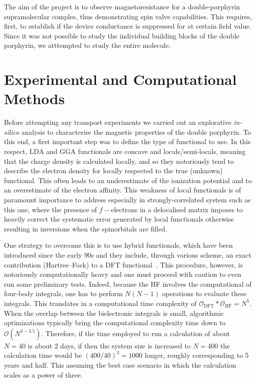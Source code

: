 The aim of the project is to observe magnetoresistance for a double-porphyrin supramolecular comples, thus demonstrating spin valve capabilities. This requires, first, to establish if the device conductance is suppressed for at certain field value. Since it was not possible to study the individual building blocks of the double porphyrin,  we atttempted to study the entire molecule.

\section{Experimental and Computational Methods}\label{sec:spinvalve:methods}

Before attempting any transport experiments we carried out an explorative \textit{in-silico} analysis to characterise the magnetic properties of the double porphyrin. To this end, a first important step was to define the type of functional to use. In this respect, \gls{LDA} and \gls{GGA} functionals are concave and locals/semi-locals, meaning that the charge density is calculated locally, and so they notoriously tend to describe the electron density for locally respected to the true (unknown) functional. This often leads to an underestimate of the ionization potential and to an overestimate of the electron affinity. This weakness of local functionals is of paramount importance to address especially in strongly-correlated system such as this one, where the presence of $f-$electrons in a delocalised matrix imposes to heavily correct the systematic error generated by local functionals otherwise resulting in inversions when the spinorbitals are filled.

One strategy to overcome this is to use hybrid functionals, which have been introduced since the early 90s and they include, through various scheme, an exact contribution (Hartree--Fock) to a DFT functional~\cite{stephens1994ab, becke1993new}. This procedure, however, is notoriously computationally heavy and one must proceed with caution to even run some preliminary tests. Indeed, because the HF involves the computational of four-body integrals, one has to perform $N(N-1)$ operations to evaluate these integrals. This translates in a computational time complexity of $\mathcal{O}_\textrm{DFT}*\mathcal{O}_\textrm{HF}=N^5$. When the overlap between the bielectronic integrals is small, algorithmic optimizations typically bring the computational complexity time down to $\mathcal{O}(N^{3-3.5})$. Therefore, if the time employed to run a calculation of about $N=40$ is about 2 days, if then the system size is increased to $N=400$ the calculation time would be $(400/40)^3=1000$ longer, roughly corresponding to 5 years and half. This assuming the best case scenario in which the calculation scales as a power of three.

